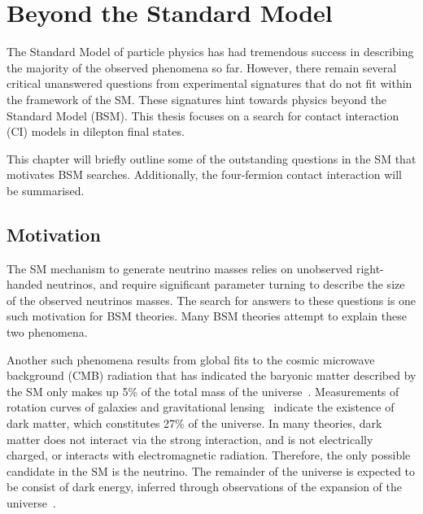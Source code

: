\chapter{Beyond the Standard Model}\label{chap:bsm}
The Standard Model of particle physics has had tremendous success in describing the majority of the observed phenomena so far. However, there remain several critical unanswered questions from experimental signatures that do not fit within the framework of the SM. These signatures hint towards physics beyond the Standard Model (BSM). This thesis focuses on a search for contact interaction (CI) models in dilepton final states. 

This chapter will briefly outline some of the outstanding questions in the SM that motivates BSM searches. Additionally, the four-fermion contact interaction will be summarised. 


\section{Motivation}
The SM mechanism to generate neutrino masses relies on unobserved right-handed neutrinos, and require significant parameter turning to describe the size of the observed neutrinos masses. The search for answers to these questions is one such motivation for BSM theories. Many BSM theories attempt to explain these two phenomena. 

Another such phenomena results from global fits to the cosmic microwave background (CMB) radiation that has indicated the baryonic matter described by the SM only makes up 5\% of the total mass of the universe~\cite{Bennett_2013,2014Plank}. Measurements of rotation curves of galaxies and gravitational lensing~\cite{roos2010dark} indicate the existence of dark matter, which constitutes 27\% of the universe. In many theories, dark matter does not interact via the strong interaction, and is not electrically charged, or interacts with electromagnetic radiation. Therefore, the only possible candidate in the SM is the neutrino. The remainder of the universe is expected to be consist of dark energy, inferred through observations of the expansion of the universe~\cite{Peebles_2003}. 

